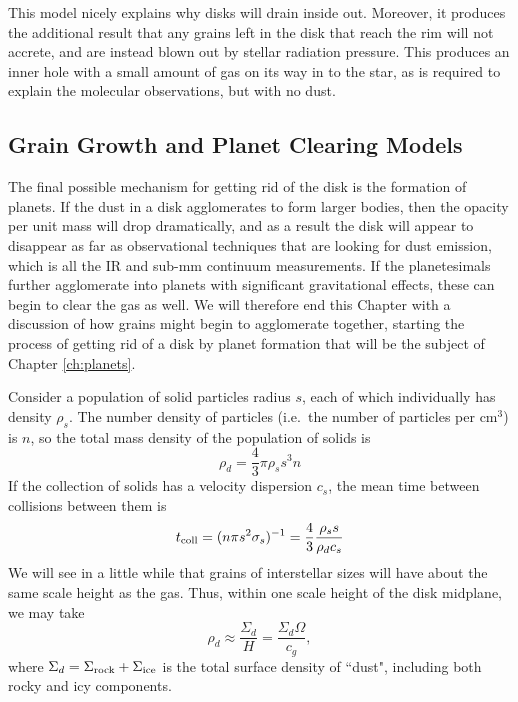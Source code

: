 This model nicely explains why disks will drain inside out. Moreover, it produces the additional result that any grains left in the disk that reach the rim will not accrete, and are instead blown out by stellar radiation pressure. This produces an inner hole with a small amount of gas on its way in to the star, as is required to explain the molecular observations, but with no dust.

\subsection{Grain Growth and Planet Clearing Models}

The final possible mechanism for getting rid of the disk is the formation of planets. If the dust in a disk agglomerates to form larger bodies, then the opacity per unit mass will drop dramatically, and as a result the disk will appear to disappear as far as observational techniques that are looking for dust emission, which is all the IR and sub-mm continuum measurements. If the planetesimals further agglomerate into planets with significant gravitational effects, these can begin to clear the gas as well. We will therefore end this Chapter with a discussion of how grains might begin to agglomerate together, starting the process of getting rid of a disk by planet formation that will be the subject of Chapter \ref{ch:planets}.

Consider a population of solid particles radius $s$, each of which individually has density $\rho_s$. The number density of particles (i.e.\ the number of particles per cm$^{3}$) is $n$, so the total mass density of the population of solids is
\begin{equation}
\rho_d = \frac{4}{3}\pi \rho_s s^3 n
\end{equation}
If the collection of solids has a velocity dispersion $c_s$, the mean time between collisions between them is
\begin{equation}
t_{\rm coll} = (n \pi s^2 \sigma_s)^{-1} = \frac{4}{3} \frac{\rho_s s}{\rho_d c_s}
\end{equation}
We will see in a little while that grains of interstellar sizes will have about the same scale height as the gas. Thus, within one scale height of the disk midplane, we may take 
\begin{equation}
\rho_d \approx \frac{\Sigma_d}{H} = \frac{\Sigma_d \Omega}{c_g},
\end{equation}
where $\Sigma_d = \Sigma_{\rm rock} + \Sigma_{\rm ice}$ is the total surface density of ``dust", including both rocky and icy components. 

